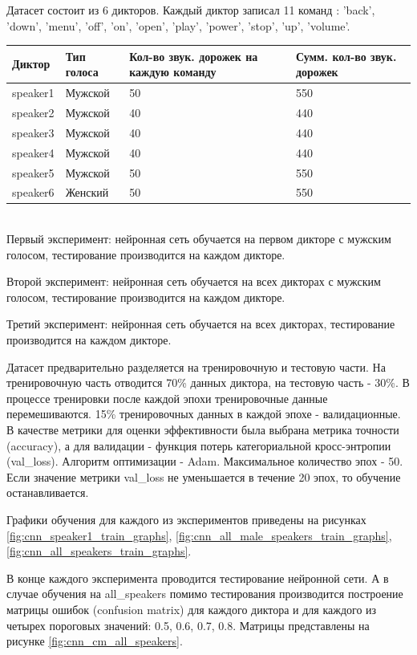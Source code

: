 \documentclass[14pt]{article}
\begin{document}
Датасет состоит из 6 дикторов. Каждый диктор записал 11 команд : 'back', 'down', 'menu', 'off', 'on', 'open', 'play', 'power', 'stop', 'up', 'volume'.
\\

\begin{tabular}[c]{ | p{2cm} | p{2cm} | p{6cm} | p{4cm} | }
\hline
Диктор & Тип голоса & Кол-во звук. дорожек на каждую команду & Сумм. кол-во звук. дорожек  \\ \hline
speaker1 & Мужской & 50 & 550 \\
speaker2 & Мужской & 40 & 440 \\
speaker3 & Мужской & 40 & 440 \\
speaker4 & Мужской & 40 & 440 \\
speaker5 & Мужской & 50 & 550 \\
speaker6 & Женский & 50 & 550 \\ \hline
\end{tabular}
\\

Первый эксперимент: нейронная сеть обучается на первом дикторе с мужским голосом, тестирование производится на каждом дикторе. 

Второй эксперимент: нейронная сеть обучается на всех дикторах с мужским голосом, тестирование производится на каждом дикторе. 

Третий эксперимент: нейронная сеть обучается на всех дикторах, тестирование производится на каждом дикторе.

Датасет предварительно разделяется на тренировочную и тестовую части. На тренировочную часть отводится 70\% данных диктора, на тестовую часть - 30\%. В процессе тренировки после каждой эпохи тренировочные данные перемешиваются. 15\% тренировочных данных в каждой эпохе - валидационные. В качестве метрики для оценки эффективности была выбрана метрика точности (accuracy), а для валидации - функция потерь категориальной кросс-энтропии (val\_loss). Алгоритм оптимизации - Adam. Максимальное количество эпох - 50. Если значение метрики val\_loss не уменьшается в течение 20 эпох, то обучение останавливается.

Графики обучения для каждого из экспериментов приведены на рисунках \ref{fig:cnn_speaker1_train_graphs}, \ref{fig:cnn_all_male_speakers_train_graphs}, \ref{fig:cnn_all_speakers_train_graphs}.

В конце каждого эксперимента проводится тестирование нейронной сети.
А в случае обучения на all\_speakers помимо тестирования производится построение матрицы ошибок (confusion matrix) для каждого диктора и для каждого из четырех пороговых значений: 0.5, 0.6, 0.7, 0.8. Матрицы представлены на рисунке \ref{fig:cnn_cm_all_speakers}.
\end{document}

